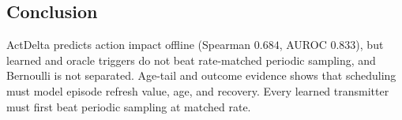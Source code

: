 \documentclass[sigconf,10pt,anonymous,review]{acmart}
\begin{document}
\subsection{Conclusion}

ActDelta predicts action impact offline (Spearman $0.684$, AUROC $0.833$), but
learned and oracle triggers do not beat rate-matched periodic sampling, and
Bernoulli is not separated. Age-tail and outcome evidence shows that scheduling
must model episode refresh value, age, and recovery. Every learned transmitter
must first beat periodic sampling at matched rate.

\clearpage


\end{document}
